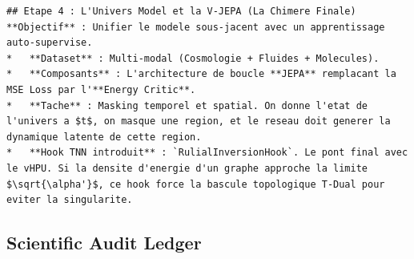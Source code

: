 \documentclass[11pt,a4paper]{article}
\begin{document}
\begin{lstlisting}[language={}, caption={}, basicstyle=\ttfamily\footnotesize, breaklines=true]
## Etape 4 : L'Univers Model et la V-JEPA (La Chimere Finale)
**Objectif** : Unifier le modele sous-jacent avec un apprentissage auto-supervise.
*   **Dataset** : Multi-modal (Cosmologie + Fluides + Molecules).
*   **Composants** : L'architecture de boucle **JEPA** remplacant la MSE Loss par l'**Energy Critic**.
*   **Tache** : Masking temporel et spatial. On donne l'etat de l'univers a $t$, on masque une region, et le reseau doit generer la dynamique latente de cette region.
*   **Hook TNN introduit** : `RulialInversionHook`. Le pont final avec le vHPU. Si la densite d'energie d'un graphe approche la limite $\sqrt{\alpha'}$, ce hook force la bascule topologique T-Dual pour eviter la singularite.

\end{lstlisting}

\subsection{Scientific Audit Ledger}
\end{document}
